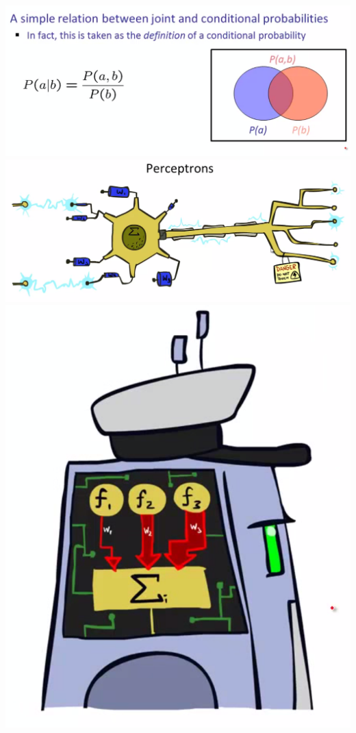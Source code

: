 \documentclass[twocolumn]{article}
\begin{document}
{\includegraphics[scale=0.5]{snapshot144}\\
\includegraphics[scale=0.3]{snapshot145}\\
\includegraphics[scale=0.5]{snapshot147}\\
}
\end{document}

